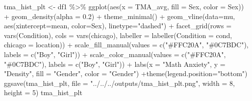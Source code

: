 \documentclass[
  letterpaper,
  DIV=11,
  numbers=noendperiod]{scrartcl}
\newenvironment{Shaded}{\begin{snugshade}}{\end{snugshade}}
\newcommand{\AttributeTok}[1]{\textcolor[rgb]{0.49,0.56,0.16}{#1}}
\newcommand{\DecValTok}[1]{\textcolor[rgb]{0.25,0.63,0.44}{#1}}
\newcommand{\FloatTok}[1]{\textcolor[rgb]{0.25,0.63,0.44}{#1}}
\newcommand{\FunctionTok}[1]{\textcolor[rgb]{0.02,0.16,0.49}{#1}}
\newcommand{\NormalTok}[1]{\textcolor[rgb]{0.00,0.44,0.13}{#1}}
\newcommand{\OtherTok}[1]{\textcolor[rgb]{0.00,0.44,0.13}{#1}}
\newcommand{\SpecialCharTok}[1]{\textcolor[rgb]{0.25,0.44,0.63}{#1}}
\newcommand{\StringTok}[1]{\textcolor[rgb]{0.25,0.44,0.63}{#1}}
\begin{document}
\begin{Shaded}
\begin{Highlighting}[]
\NormalTok{tma\_hist\_plt }\OtherTok{\textless{}{-}}\NormalTok{ df1 }\SpecialCharTok{\%\textgreater{}\%} \FunctionTok{ggplot}\NormalTok{(}\FunctionTok{aes}\NormalTok{(}\AttributeTok{x =}\NormalTok{ TMA\_avg, }\AttributeTok{fill =}\NormalTok{ Sex,}
                   \AttributeTok{color =}\NormalTok{ Sex)) }\SpecialCharTok{+}
  \FunctionTok{geom\_density}\NormalTok{(}\AttributeTok{alpha =} \FloatTok{0.2}\NormalTok{) }\SpecialCharTok{+}
  \FunctionTok{theme\_minimal}\NormalTok{() }\SpecialCharTok{+}
  \FunctionTok{geom\_vline}\NormalTok{(}\AttributeTok{data=}\NormalTok{mu, }\FunctionTok{aes}\NormalTok{(}\AttributeTok{xintercept=}\NormalTok{mean, }\AttributeTok{color=}\NormalTok{Sex),}
           \AttributeTok{linetype=}\StringTok{"dashed"}\NormalTok{) }\SpecialCharTok{+}
  \FunctionTok{facet\_grid}\NormalTok{(}\AttributeTok{rows =} \FunctionTok{vars}\NormalTok{(Condition),}
             \AttributeTok{cols =} \FunctionTok{vars}\NormalTok{(chicago),}
             \AttributeTok{labeller =} \FunctionTok{labeller}\NormalTok{(}\AttributeTok{Condition =}\NormalTok{ cond,}
                                 \AttributeTok{chicago =}\NormalTok{ location)) }\SpecialCharTok{+}
  \FunctionTok{scale\_fill\_manual}\NormalTok{(}\AttributeTok{values =} \FunctionTok{c}\NormalTok{(}\StringTok{"\#FFC20A"}\NormalTok{, }\StringTok{"\#0C7BDC"}\NormalTok{), }\AttributeTok{labels =} \FunctionTok{c}\NormalTok{(}\StringTok{"Boy"}\NormalTok{, }\StringTok{"Girl"}\NormalTok{)) }\SpecialCharTok{+}
  \FunctionTok{scale\_color\_manual}\NormalTok{(}\AttributeTok{values =} \FunctionTok{c}\NormalTok{(}\StringTok{"\#FFC20A"}\NormalTok{, }\StringTok{"\#0C7BDC"}\NormalTok{), }\AttributeTok{labels =} \FunctionTok{c}\NormalTok{(}\StringTok{"Boy"}\NormalTok{, }\StringTok{"Girl"}\NormalTok{)) }\SpecialCharTok{+}
  \FunctionTok{labs}\NormalTok{(}\AttributeTok{x =} \StringTok{"Math Anxiety"}\NormalTok{, }\AttributeTok{y =} \StringTok{"Density"}\NormalTok{,}
       \AttributeTok{fill =} \StringTok{"Gender"}\NormalTok{, }\AttributeTok{color =} \StringTok{"Gender"}\NormalTok{) }\SpecialCharTok{+}\FunctionTok{theme}\NormalTok{(}\AttributeTok{legend.position=}\StringTok{"bottom"}\NormalTok{)}
\FunctionTok{ggsave}\NormalTok{(tma\_hist\_plt, }\AttributeTok{file =}  \StringTok{"../../../outputs/tma\_hist\_plt.png"}\NormalTok{,}
       \AttributeTok{width =} \DecValTok{8}\NormalTok{, }\AttributeTok{height =} \DecValTok{5}\NormalTok{)}
\NormalTok{tma\_hist\_plt}
\end{Highlighting}
\end{Shaded}
\end{document}
